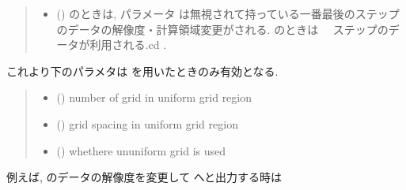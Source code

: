 \documentclass[letterpaper,10pt,dvipdfmx,report]{sphinxmanual}
\begin{document}
\begin{fulllineitems}
\begin{quote}
\begin{description}
\begin{itemize}
\item {} 
\sphinxAtStartPar
{} () \sphinxhyphen{}\sphinxhyphen{}  のときは, パラメータ  は無視されて持っている一番最後のステップのデータの解像度・計算領域変更がされる.  のときは　 ステップのデータが利用される.cd .

\end{itemize}

\end{description}\end{quote}

\sphinxAtStartPar
これより下のパラメタは  を用いたときのみ有効となる.
\begin{quote}\begin{description}
\begin{itemize}
\item {} 
\sphinxAtStartPar
{} () \sphinxhyphen{}\sphinxhyphen{} number of grid in uniform grid region

\item {} 
\sphinxAtStartPar
{} () \sphinxhyphen{}\sphinxhyphen{} grid spacing in uniform grid region

\item {} 
\sphinxAtStartPar
{} () \sphinxhyphen{}\sphinxhyphen{} whethere ununiform grid is used

\end{itemize}

\end{description}\end{quote}

\end{fulllineitems}


\sphinxAtStartPar
例えば,  のデータの解像度を変更して  へと出力する時は

\begin{sphinxVerbatim}[commandchars=\\\{\}]
  
\end{sphinxVerbatim}
\end{document}

